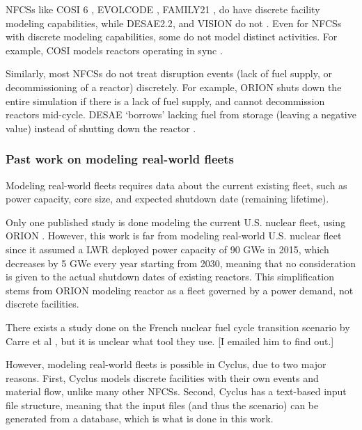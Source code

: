\glspl{NFCS} like COSI 6 \cite{meyer_new_2009}, EVOLCODE \cite{alvaerz-velarde_validation_2014},
FAMILY21 \cite{oecd_nuclear_2009},
do have discrete facility modeling capabilities, while
DESAE2.2\cite{tsibulskiy_desae_2006}, and VISION \cite{jacobson_verifiable_2010} do
not \cite{boucher_international_2010}. Even for \glspl{NFCS} with discrete modeling
capabilities, some do not model distinct activities. For example, COSI models
reactors operating in sync \cite{boucher_benchmark_2012}.

Similarly, most \glspl{NFCS} do not treat disruption events (lack of fuel supply,
or decommissioning of a reactor)
discretely. For example, ORION shuts down the entire simulation if there
is a lack of fuel supply, and cannot decommission reactors mid-cycle.
DESAE `borrows' lacking fuel from storage (leaving a
negative value) instead of shutting down the reactor \cite{mccarthy_benchmark_2012}.

\subsubsection{Past work on modeling real-world fleets}
Modeling real-world fleets requires data about the current existing fleet,
such as power capacity, core size, and expected shutdown date (remaining lifetime).

Only one published study is done modeling the current U.S. nuclear fleet,
using ORION \cite{sunny_transition_2015}. However, this work is far from
modeling real-world U.S. nuclear fleet since it assumed a \gls{LWR} deployed power capacity
of 90 GWe in 2015, which decreases by 5 GWe every year starting from 2030,
meaning that no consideration is given to the actual shutdown dates of
existing reactors. This simplification stems from ORION modeling reactor as
a fleet governed by a power demand, not discrete facilities.

There exists a study done on the French nuclear fuel cycle transition scenario
by Carre et al \cite{carre_overview_2009}, but it is unclear what tool they use.
[I emailed him to find out.]

However, modeling real-world fleets is possible in Cyclus, due to two major
reasons. First, Cyclus models
discrete facilities with their own events and material flow, unlike many other
\glspl{NFCS}. Second, Cyclus has a text-based input file structure, meaning that
the input files (and thus the scenario) can be generated from 
a database, which is what is done in this work.

